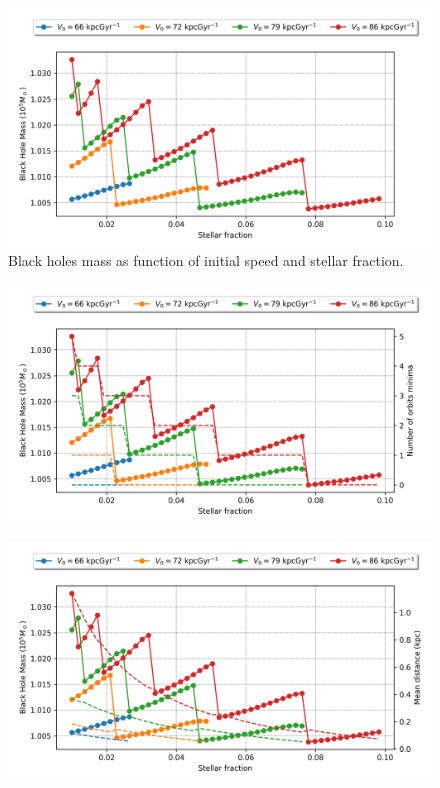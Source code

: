 \documentclass{beamer}
\begin{document}
\begin{frame}
\begin{figure}[h]
	\centering
	\includegraphics[width=0.9\linewidth]{"../Files/Week 6/mass_stellar_speed"}
	\caption{Black holes mass as function of initial speed and stellar fraction.}
\end{figure}
\end{frame}

\begin{frame}
\begin{figure}[h]
	\centering
	\includegraphics[width=0.9\linewidth]{"../Files/Week 6/mass_stellar_speed_2"}
\end{figure}
\end{frame}
\begin{frame}
\begin{figure}[h]
	\centering
	\includegraphics[width=0.9\linewidth]{"../Files/Week 6/mass_stellar_speed_3"}
\end{figure}
\end{frame}
\end{document}
